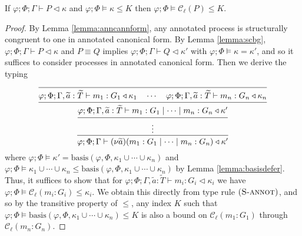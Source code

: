 \begin{lemma}\label{lemma:localcompl}
If $\varphi;\Phi;\Gamma\vdash P \triangleleft \kappa$ and $\varphi;\Phi\vDash \kappa \leq K$ then $\varphi;\Phi\vDash \mathcal{C}_\ell(P) \leq K$.
\begin{proof}
    By Lemma \ref{lemma:anncannform}, any annotated process is structurally congruent to one in annotated canonical form. By Lemma \ref{lemma:scbg}, $\varphi;\Phi;\Gamma\vdash P \triangleleft \kappa$ and $P\equiv Q$ implies $\varphi;\Phi;\Gamma\vdash Q \triangleleft \kappa'$ with $\varphi;\Phi\vDash \kappa = \kappa'$, and so it suffices to consider processes in annotated canonical form. Then we derive the typing
    \begin{align*}
    \begin{prooftree}
    \Infer0{\varphi;\Phi;\Gamma,\widetilde{a}:\widetilde{T}\vdash m_1 : G_1 \triangleleft \kappa_1\quad \cdots \quad \varphi;\Phi;\Gamma,\widetilde{a}:\widetilde{T}\vdash m_n : G_n \triangleleft \kappa_n}
    \Infer1{\varphi;\Phi;\Gamma,\widetilde{a}:\widetilde{T}\vdash m_1: G_1 \mid \cdots \mid m_n : G_n \triangleleft \kappa'}
    \Infer1{\vdots}
    \Infer1{\varphi;\Phi;\Gamma\vdash \newvar{\widetilde{a}}{(m_1 : G_1 \mid \cdots \mid m_n : G_n)} \triangleleft \kappa'}
    \end{prooftree}
    \end{align*}
    where $\varphi;\Phi\vDash \kappa' = \text{basis}(\varphi,\Phi,\kappa_1 \cup \cdots \cup \kappa_n)$ and $\varphi;\Phi\vDash \kappa_1 \cup \cdots \cup \kappa_n \leq \text{basis}(\varphi,\Phi,\kappa_1 \cup \cdots \cup \kappa_n)$ by Lemma \ref{lemma:basisdefer}. Thus, it suffices to show that for $\varphi;\Phi;\Gamma,\widetilde{a}:\widetilde{T}\vdash m_i : G_i \triangleleft \kappa_i$ we have $\varphi;\Phi\vDash \mathcal{C}_\ell(m_i : G_i) \leq \kappa_i$. We obtain this directly from type rule $\mbox{\textsc{\protect{(S-annot})}}$, and so by the transitive property of $\leq$, any index $K$ such that $\varphi;\Phi\vDash \text{basis}(\varphi,\Phi,\kappa_1 \cup \cdots \cup \kappa_n) \leq K$ is also a bound on $\mathcal{C}_\ell(m_1 : G_1)$ through $\mathcal{C}_\ell(m_n : G_n)$.

\end{proof}
\end{lemma}
